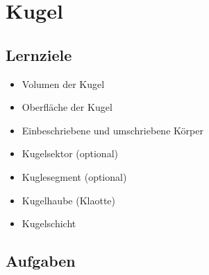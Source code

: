 \section{Kugel}


\subsection*{Lernziele}
\begin{itemize}
\item Volumen der Kugel
\item Oberfläche der Kugel
\item Einbeschriebene und umschriebene Körper
\item Kugelsektor (optional)
\item Kuglesegment (optional)
\item Kugelhaube (Klaotte)
\item Kugelschicht
\end{itemize}

\subsection*{Aufgaben}
\newpage
